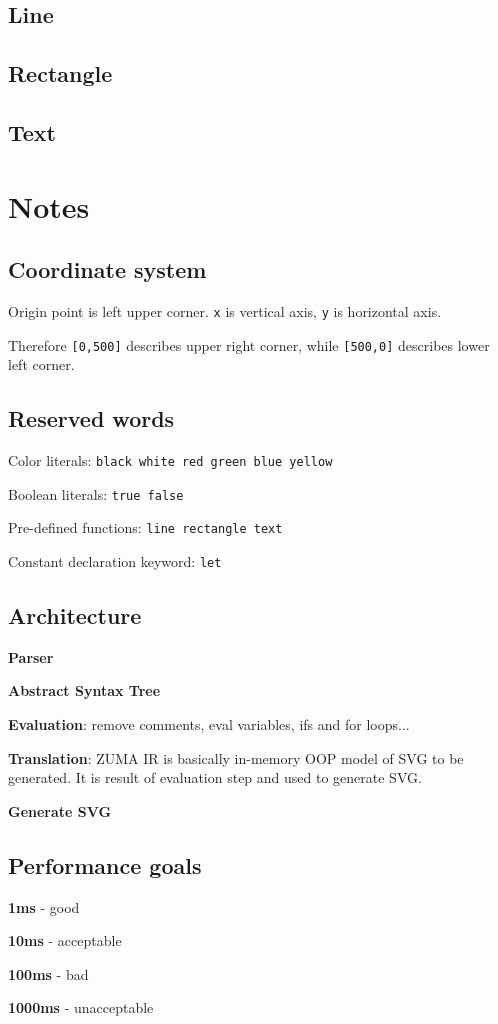\documentclass{scrreprt}
\begin{document}
\section{Line}

\section{Rectangle}

\section{Text}


\chapter{Notes}

\section{Coordinate system}

Origin point is left upper corner. \texttt{x} is vertical axis, \texttt{y} is horizontal axis.

Therefore \texttt{[0,500]} describes upper right corner, while \texttt{[500,0]} describes lower left corner.


\section{Reserved words}

Color literals: \texttt{black white red green blue yellow}

Boolean literals: \texttt{true false}

Pre-defined functions: \texttt{line rectangle text}

Constant declaration keyword: \texttt{let}


\section{Architecture}

\textbf{Parser}

\textbf{Abstract Syntax Tree}

\textbf{Evaluation}: remove comments, eval variables, ifs and for loops...

\textbf{Translation}: ZUMA IR is basically in-memory OOP model of SVG to be generated. It is result of evaluation step and used to generate SVG.

\textbf{Generate SVG} 


\section{Performance goals}

\textbf{1ms} - good

\textbf{10ms} - acceptable

\textbf{100ms} - bad

\textbf{1000ms} - unacceptable
\end{document}
